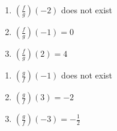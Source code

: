 \begin{multicols}{3}
\begin{enumerate}
\setcounter{enumi}{\value{HW}}

\item $\left(\frac{f}{g}\right)(-2)$ does not exist
\item $\left(\frac{f}{g}\right)(-1) = 0$
\item $\left(\frac{f}{g}\right)(2) = 4$

\setcounter{HW}{\value{enumi}}
\end{enumerate}
\end{multicols}

\begin{multicols}{3}
\begin{enumerate}
\setcounter{enumi}{\value{HW}}

\item $\left(\frac{g}{f}\right)(-1)$ does not exist
\item $\left(\frac{g}{f}\right)(3) = -2$ 
\item $\left(\frac{g}{f}\right)(-3) = -\frac{1}{2}$ 

\setcounter{HW}{\value{enumi}}
\end{enumerate}
\end{multicols}

\closegraphsfile